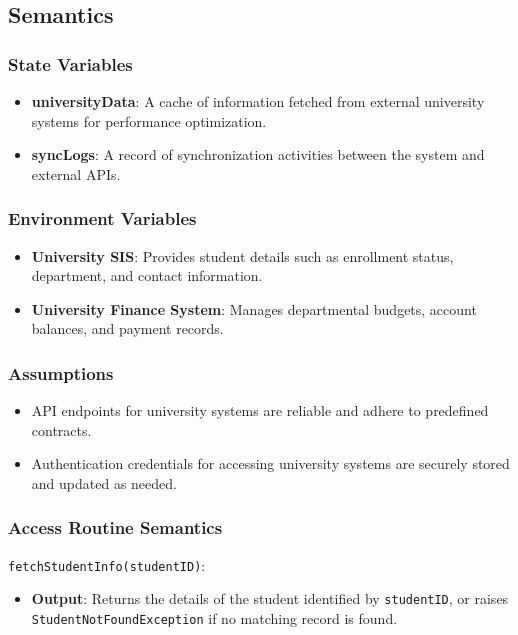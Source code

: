 \documentclass[12pt, titlepage]{article}
\begin{document}
\subsection{Semantics}

\subsubsection{State Variables}
\begin{itemize}
    \item \textbf{universityData}: A cache of information fetched from external university systems for performance optimization.
    \item \textbf{syncLogs}: A record of synchronization activities between the system and external APIs.
\end{itemize}

\subsubsection{Environment Variables}
\begin{itemize}
    \item \textbf{University SIS}: Provides student details such as enrollment status, department, and contact information.
    \item \textbf{University Finance System}: Manages departmental budgets, account balances, and payment records.
\end{itemize}

\subsubsection{Assumptions}
\begin{itemize}
    \item API endpoints for university systems are reliable and adhere to predefined contracts.
    \item Authentication credentials for accessing university systems are securely stored and updated as needed.
\end{itemize}

\subsubsection{Access Routine Semantics}

\noindent \texttt{fetchStudentInfo(studentID)}:
\begin{itemize}
    \item \textbf{Output}: Returns the details of the student identified by \texttt{studentID}, or raises \texttt{StudentNotFoundException} if no matching record is found.
\end{itemize}
\end{document}
